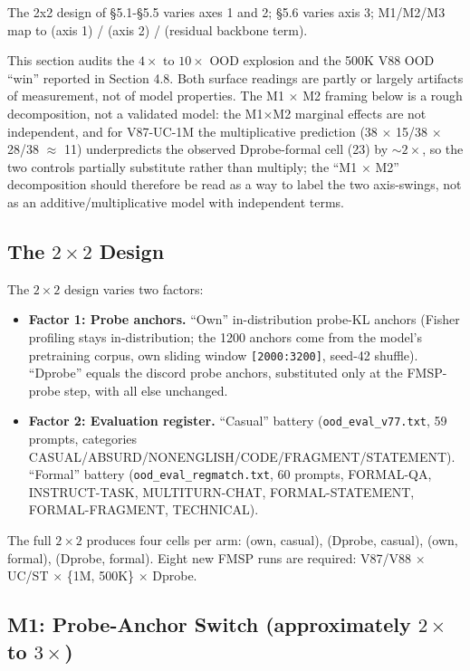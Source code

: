 \documentclass[11pt]{article}
\begin{document}
The 2x2 design of \S5.1-\S5.5 varies axes 1 and 2; \S5.6 varies axis 3; M1/M2/M3 map to (axis 1) / (axis 2) / (residual backbone term).

This section audits the $4\times$ to $10\times$ OOD explosion and the 500K V88 OOD ``win'' reported in Section 4.8. Both surface readings are partly or largely artifacts of measurement, not of model properties. The M1 $\times$ M2 framing below is a rough decomposition, not a validated model: the M1$\times$M2 marginal effects are not independent, and for V87-UC-1M the multiplicative prediction (38 $\times$ 15/38 $\times$ 28/38 $\approx$ 11) underpredicts the observed Dprobe-formal cell (23) by $\sim$$2\times$, so the two controls partially substitute rather than multiply; the ``M1 $\times$ M2'' decomposition should therefore be read as a way to label the two axis-swings, not as an additive/multiplicative model with independent terms.

\subsection{The $2\times 2$ Design}

The $2\times 2$ design varies two factors:

\begin{itemize}
  \item \textbf{Factor 1: Probe anchors.} ``Own'' in-distribution probe-KL anchors (Fisher profiling stays in-distribution; the 1200 anchors come from the model's pretraining corpus, own sliding window \texttt{[2000:3200]}, seed-42 shuffle). ``Dprobe'' equals the discord probe anchors, substituted only at the FMSP-probe step, with all else unchanged.
  \item \textbf{Factor 2: Evaluation register.} ``Casual'' battery (\texttt{ood\_eval\_v77.txt}, 59 prompts, categories CASUAL/ABSURD/NONENGLISH/CODE/FRAGMENT/STATEMENT). ``Formal'' battery (\texttt{ood\_eval\_regmatch.txt}, 60 prompts, FORMAL-QA, INSTRUCT-TASK, MULTITURN-CHAT, FORMAL-STATEMENT, FORMAL-FRAGMENT, TECHNICAL).
\end{itemize}

The full $2\times 2$ produces four cells per arm: (own, casual), (Dprobe, casual), (own, formal), (Dprobe, formal). Eight new FMSP runs are required: V87/V88 $\times$ UC/ST $\times$ \{1M, 500K\} $\times$ Dprobe.

\subsection{M1: Probe-Anchor Switch (approximately $2\times$ to $3\times$)}
\end{document}
